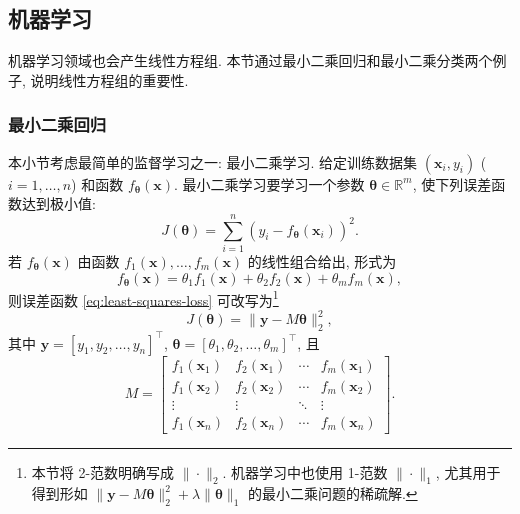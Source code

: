 \subsection{{机器学习}}\label{sec:machine-learning}
{机器学习领域也会产生线性方程组. 本节通过最小二乘回归和最小二乘分类两个例子, 说明线性方程组的重要性.}
\subsubsection{{最小二乘回归}}\label{subsec:least-squares-regression}
{本小节考虑最简单的监督学习之一: 最小二乘学习. 给定训练数据集 \linebreak[4]$(\boldsymbol{x}_i,y_i)$ ($i=1,\ldots,n$) 和函数 $f_{\boldsymbol{\theta}}(\boldsymbol{x})$. 最小二乘学习要学习一个参数 $\boldsymbol{\theta}\in\mathbb{R}^m$, 使下列误差函数达到极小值:}
\begin{equation}\label{eq:least-squares-loss}
J(\boldsymbol{\theta})=\sum_{i=1}^n(y_i-f_{\boldsymbol{\theta}}(\boldsymbol{x}_i))^2.
\end{equation}
{若 $f_{\boldsymbol{\theta}}(\boldsymbol{x})$ 由函数 $f_1(\boldsymbol{x}),\ldots,f_m(\boldsymbol{x})$ 的线性组合给出, 形式为}
\begin{equation}\label{eq:regression-basis-model}
f_{\boldsymbol{\theta}}(\boldsymbol{x})=\theta_1f_1(\boldsymbol{x})+\theta_2f_2(\boldsymbol{x})+\theta_mf_m(\boldsymbol{x}),
\end{equation}
{则误差函数 \eqref{eq:least-squares-loss} 可改写为}\footnote{{本节将 2-范数明确写成 $\|\cdot\|_2$. 机器学习中也使用 1-范数 $\|\cdot\|_1$, 尤其用于得到形如 $\|\boldsymbol{y}-M\boldsymbol{\theta}\|_2^2+\lambda\|\boldsymbol{\theta}\|_1$ 的最小二乘问题的稀疏解.}}
\begin{equation}\label{eq:least-squares-matrix-loss}
J(\boldsymbol{\theta})=\|\boldsymbol{y}-M\boldsymbol{\theta}\|_2^2,
\end{equation}
{其中 $\boldsymbol{y}=[y_1,y_2,\ldots,y_n]^{\top}$, $\boldsymbol{\theta}=[\theta_1,\theta_2,\ldots,\theta_m]^{\top}$, 且}
\[M=\begin{bmatrix}
f_1(\boldsymbol{x}_1)&f_2(\boldsymbol{x}_1)&\cdots&f_m(\boldsymbol{x}_1)\\
f_1(\boldsymbol{x}_2)&f_2(\boldsymbol{x}_2)&\cdots&f_m(\boldsymbol{x}_2)\\
\vdots&\vdots&\ddots&\vdots\\
f_1(\boldsymbol{x}_n)&f_2(\boldsymbol{x}_n)&\cdots&f_m(\boldsymbol{x}_n)
\end{bmatrix}.\]
